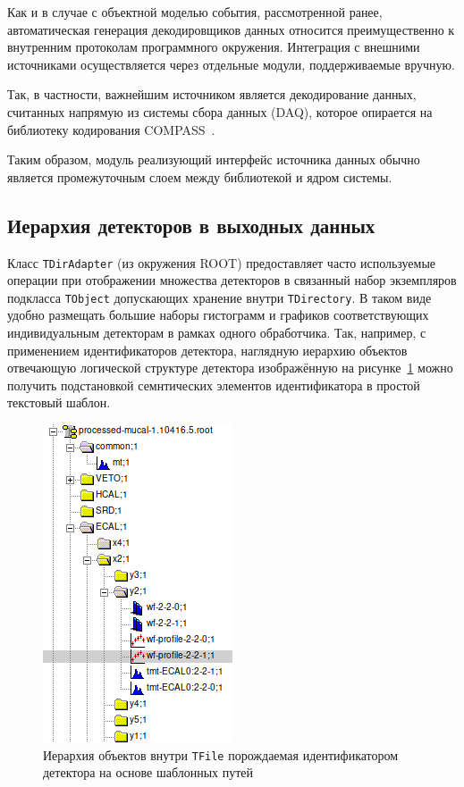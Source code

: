 Как и в случае с объектной моделью события, рассмотренной ранее,
автоматическая генерация декодировщиков данных относится преимущественно
к внутренним протоколам программного окружения. Интеграция с внешними
источниками осуществляется через отдельные модули, поддерживаемые вручную.

Так, в частности, важнейшим источником является декодирование данных,
считанных напрямую из системы сбора данных (DAQ), которое опирается
на библиотеку кодирования COMPASS~\cite{compass-daq}.

Таким образом, модуль реализующий интерфейс источника данных обычно
является промежуточным слоем между библиотекой и ядром системы.

\subsection{Иерархия детекторов в выходных данных}

Класс \texttt{TDirAdapter} (из окружения ROOT) предоставляет
часто используемые операции при отображении множества детекторов в связанный
набор экземпляров подкласса \texttt{TObject} допускающих
хранение внутри \texttt{TDirectory}. В таком виде удобно
размещать большие наборы гистограмм и
графиков соответствующих индивидуальным детекторам в рамках одного
обработчика. Так, например, с применением идентификаторов детектора,
наглядную иерархию объектов отвечающую
логической структуре детектора изображённую на
рисунке~\ref{fig:tobject-hierarchy} можно получить подстановкой
семнтических элементов идентификатора в простой текстовый шаблон.

\begin{figure}
    \centering
    \includegraphics[width=0.25\linewidth]{images//illustrative/items-structure-in-root-file.png}
    \caption{Иерархия объектов внутри \texttt{TFile} порождаемая
    идентификатором детектора на основе шаблонных путей}
    \label{fig:tobject-hierarchy}
\end{figure}

